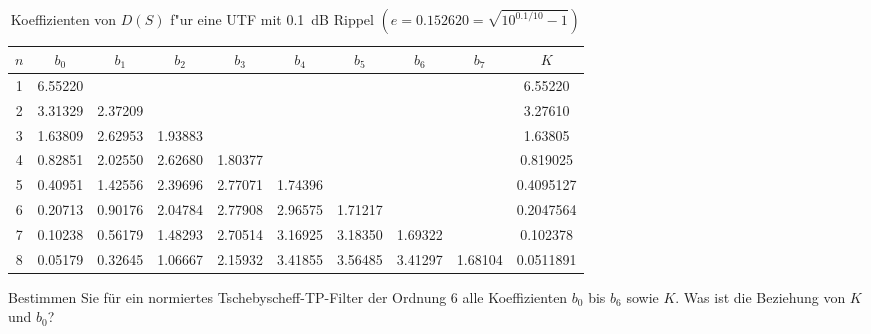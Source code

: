 \begin{table}[!htb]
\begin{center}
{\footnotesize
\begin{tabular}{|c||c|c|c|c|c|c|c|c||c|}\hline
$n$ & $b_0$ & $b_1$ & $b_2$ & $b_3$ & $b_4$ & $b_5$ & $b_6$ & $b_7$ & $K$\\ \hline\hline
 1 & 6.55220 & & & & & & & & 6.55220   \\ \hline
 2 & 3.31329 & 2.37209 & & & & & & & 3.27610\\ \hline
 3 & 1.63809 & 2.62953 & 1.93883 & & & & & & 1.63805  \\ \hline
 4 & 0.82851 & 2.02550 & 2.62680 & 1.80377 & & & & & 0.819025 \\ \hline
 5 & 0.40951 & 1.42556 & 2.39696 & 2.77071 & 1.74396 & & & & 0.4095127  \\ \hline
 6 & 0.20713 & 0.90176 & 2.04784 & 2.77908 & 2.96575 & 1.71217 & & & 0.2047564  \\ \hline   
 7 & 0.10238 & 0.56179 & 1.48293 & 2.70514 & 3.16925 & 3.18350 & 1.69322 & & 0.102378 \\ \hline   
 8 & 0.05179 & 0.32645 & 1.06667 & 2.15932 & 3.41855 & 3.56485 & 3.41297 & 1.68104 & 0.0511891 \\ \hline
\end{tabular}\vspace*{-1mm}\caption{Koeffizienten von $D(S)$ f"ur eine UTF mit 0.1~dB Rippel $(e=0.152620=\sqrt{10^{0.1/10}-1})$}\label{koef-0.1}
}
\end{center}
\vspace*{-4mm}
\end{table}
\aufg Bestimmen Sie f\"ur ein normiertes Tschebyscheff-TP-Filter der
Ordnung 6 alle Koeffizienten $b_0$ bis $b_6$ sowie $K$. Was ist die
Beziehung von $K$ und $b_0$?

